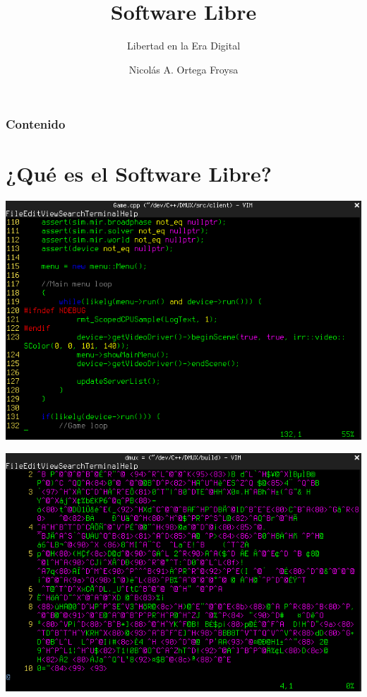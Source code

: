 \documentclass[xetex, mathserif, serif]{beamer}
\title{Software Libre}
\subtitle{Libertad en la Era Digital}
\author{Nicolás A. Ortega Froysa}
\institute{Universidad de Jáen}
\date{} %
\begin{document}
\frame{\titlepage}


\begin{frame}
    \frametitle{Contenido}
    \tableofcontents
\end{frame}


\section{¿Qué es el Software Libre?}
\begin{frame}
\end{frame}


\begin{frame}
    \centering
    \includegraphics[scale=0.4]{imgs/source}
\end{frame}


\begin{frame}
    \centering
    \includegraphics[scale=0.4]{imgs/binary}
\end{frame}
\end{document}
